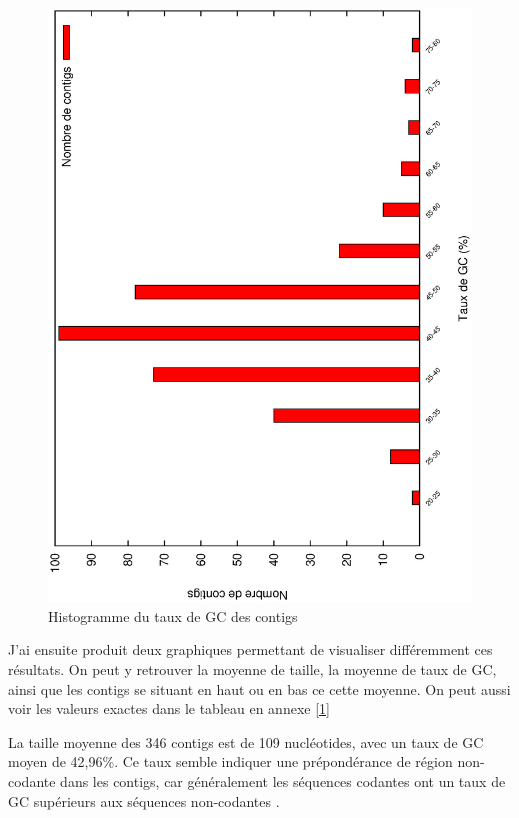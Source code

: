 \documentclass[10.9pt]{article} %
\begin{document}
\begin{figure}[p]
\includegraphics[scale=0.6,angle=270]{question_1/histogramme_taux.eps}
\caption{Histogramme du taux de GC des contigs}
\end{figure}

J'ai ensuite produit deux graphiques permettant de visualiser différemment ces résultats. On peut
y retrouver la moyenne de taille, la moyenne de taux de GC, ainsi que les contigs se situant en
haut ou en bas ce cette moyenne. On peut aussi voir les valeurs exactes dans le tableau en annexe \ref{1}

La taille moyenne des 346 contigs est de 109 nucléotides, avec un taux de GC moyen de 42,96\%. Ce taux semble
indiquer une prépondérance de région non-codante dans les contigs, car généralement les séquences codantes ont
un taux de GC supérieurs aux séquences non-codantes \cite{Wikipedia-GC}.
\end{document}
